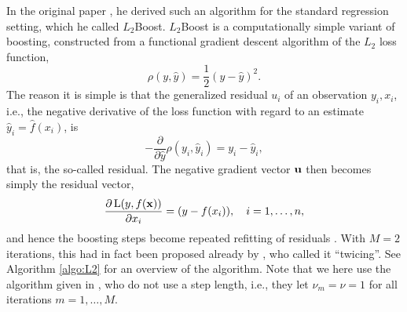 In the original paper \citep{friedman2001}, he derived such an algorithm for the standard regression setting, which he called $L_2$Boost. $L_2$Boost is a computationally simple variant of boosting, constructed from a functional gradient descent algorithm of the $L_2$ loss function,
\begin{equation*}
    \rho(y, \hat{y})=\frac{1}{2}(y-\hat{y})^2.
\end{equation*}
The reason it is simple is that the generalized residual $u_i$ of an observation $y_i,x_i$, i.e., the negative derivative of the loss function with regard to an estimate $\hat{y}_i=\hat{f}(x_i)$, is
\begin{equation*}
    -\frac{\partial}{\partial\hat{y}}\rho(y_i, \hat{y}_i)=y_i-\hat{y}_i,
\end{equation*}
that is, the so-called residual. The negative gradient vector $\mathbf{u}$ then becomes simply the residual vector,
\begin{equation*}
    \frac{\partial\operatorname{L}(y,f(\mathbf{x}))}{\partial x_i}=(y-f(x_i)),\quad i=1,\dotsc,n,
\end{equation*}
and hence the boosting steps become repeated refitting of residuals \citep{friedman2001,buhlmann-yu}. With $M=2$ iterations, this had in fact been proposed already by \citet{tukey}, who called it ``twicing''. See Algorithm \ref{algo:L2} for an overview of the algorithm. Note that we here use the algorithm given in \citet{buhlmann-yu}, who do not use a step length, i.e., they let $\nu_m=\nu=1$ for all iterations $m=1,\ldots,M$.
